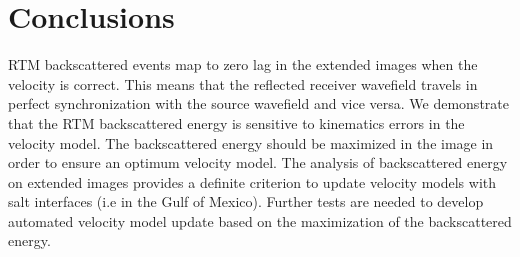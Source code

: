 \section{Conclusions}

RTM backscattered events map to zero lag in the extended images when the
velocity is correct. This means that the reflected
receiver wavefield travels in perfect synchronization with the source wavefield and
vice versa. We demonstrate that the RTM backscattered energy is sensitive to kinematics errors
in the velocity model. The backscattered energy
 should be maximized in the image in order to ensure an optimum velocity 
model. The analysis of backscattered energy on extended images provides a definite criterion to update 
velocity models with salt interfaces (i.e in the Gulf of Mexico).
 Further tests are needed to develop automated velocity model update based on the maximization of 
the backscattered energy. 
